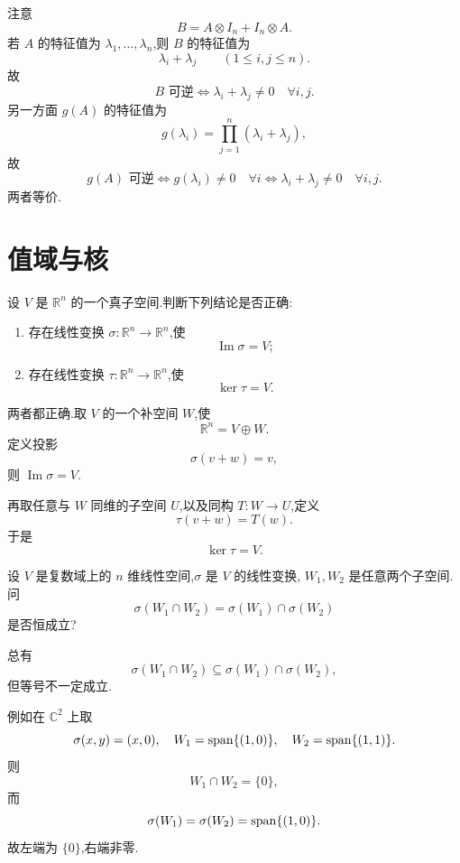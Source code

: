 \begin{solution}
注意
\[
B=A\otimes I_n+I_n\otimes A.
\]
若 $A$ 的特征值为 $\lambda_1,\ldots,\lambda_n$,则 $B$ 的特征值为
\[
\lambda_i+\lambda_j\qquad(1\leq i,j\leq n).
\]
故
\[
B\text{ 可逆}
\iff
\lambda_i+\lambda_j\neq0\quad\forall i,j.
\]
另一方面 $g(A)$ 的特征值为
\[
g(\lambda_i)=\prod\limits_{j=1}^{n}(\lambda_i+\lambda_j),
\]
故
\[
g(A)\text{ 可逆}
\iff
g(\lambda_i)\neq0\quad\forall i
\iff
\lambda_i+\lambda_j\neq0\quad\forall i,j.
\]
两者等价.
\end{solution}


\newpage

\section{值域与核}

\begin{example}
设 $V$ 是 $\mathbb{R}^n$ 的一个真子空间.判断下列结论是否正确:
\begin{enumerate}
    \item 存在线性变换 $\sigma:\mathbb{R}^n\to\mathbb{R}^n$,使
    \[
    \operatorname{Im}\sigma=V;
    \]
    \item 存在线性变换 $\tau:\mathbb{R}^n\to\mathbb{R}^n$,使
    \[
    \ker\tau=V.
    \]
\end{enumerate}
\end{example}
\exampleblank

\begin{solution}
两者都正确.取 $V$ 的一个补空间 $W$,使
\[
\mathbb{R}^n=V\oplus W.
\]
定义投影
\[
\sigma(v+w)=v,
\]
则 $\operatorname{Im}\sigma=V$.

再取任意与 $W$ 同维的子空间 $U$,以及同构 $T:W\to U$,定义
\[
\tau(v+w)=T(w).
\]
于是
\[
\ker\tau=V.
\]
\end{solution}


\begin{example}
设 $V$ 是复数域上的 $n$ 维线性空间,$\sigma$ 是 $V$ 的线性变换,
$W_1,W_2$ 是任意两个子空间.问
\[
\sigma(W_1\cap W_2)=\sigma(W_1)\cap\sigma(W_2)
\]
是否恒成立?
\end{example}
\exampleblank

\begin{solution}
总有
\[
\sigma(W_1\cap W_2)
\subseteq
\sigma(W_1)\cap\sigma(W_2),
\]
但等号不一定成立.

例如在 $\mathbb{C}^2$ 上取
\[
\sigma(x,y)=(x,0),
\quad
W_1=\operatorname{span}\{(1,0)\},
\quad
W_2=\operatorname{span}\{(1,1)\}.
\]
则
\[
W_1\cap W_2=\{0\},
\]
而
\[
\sigma(W_1)=\sigma(W_2)=\operatorname{span}\{(1,0)\}.
\]
故左端为 $\{0\}$,右端非零.
\end{solution}


